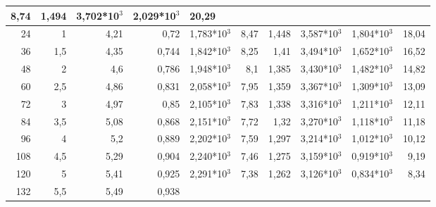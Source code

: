 \begin{table}[H]
{\begin{tabular}{|rr|rrl|rrl|l|r|}
  \multicolumn{1}{r|}{8,74} &
  \multicolumn{1}{r|}{1,494} &
  3,702*10$^3$ &
  2,029*10$^3$ &
  20,29 \\ \hline
\multicolumn{1}{|r|}{24} &
  1 &
  \multicolumn{1}{r|}{4,21} &
  \multicolumn{1}{r|}{0,72} &
  1,783*10$^3$ &
  \multicolumn{1}{r|}{8,47} &
  \multicolumn{1}{r|}{1,448} &
  3,587*10$^3$ &
  1,804*10$^3$ &
  18,04 \\ \hline
\multicolumn{1}{|r|}{36} &
  1,5 &
  \multicolumn{1}{r|}{4,35} &
  \multicolumn{1}{r|}{0,744} &
  1,842*10$^3$ &
  \multicolumn{1}{r|}{8,25} &
  \multicolumn{1}{r|}{1,41} &
  3,494*10$^3$ &
  1,652*10$^3$ &
  16,52 \\ \hline
\multicolumn{1}{|r|}{48} &
  2 &
  \multicolumn{1}{r|}{4,6} &
  \multicolumn{1}{r|}{0,786} &
  1,948*10$^3$ &
  \multicolumn{1}{r|}{8,1} &
  \multicolumn{1}{r|}{1,385} &
  3,430*10$^3$ &
  1,482*10$^3$ &
  14,82 \\ \hline
\multicolumn{1}{|r|}{60} &
  2,5 &
  \multicolumn{1}{r|}{4,86} &
  \multicolumn{1}{r|}{0,831} &
  2,058*10$^3$ &
  \multicolumn{1}{r|}{7,95} &
  \multicolumn{1}{r|}{1,359} &
  3,367*10$^3$ &
  1,309*10$^3$ &
  13,09 \\ \hline
\multicolumn{1}{|r|}{72} &
  3 &
  \multicolumn{1}{r|}{4,97} &
  \multicolumn{1}{r|}{0,85} &
  2,105*10$^3$ &
  \multicolumn{1}{r|}{7,83} &
  \multicolumn{1}{r|}{1,338} &
  3,316*10$^3$ &
  1,211*10$^3$ &
  12,11 \\ \hline
\multicolumn{1}{|r|}{84} &
  3,5 &
  \multicolumn{1}{r|}{5,08} &
  \multicolumn{1}{r|}{0,868} &
  2,151*10$^3$ &
  \multicolumn{1}{r|}{7,72} &
  \multicolumn{1}{r|}{1,32} &
  3,270*10$^3$ &
  1,118*10$^3$ &
  11,18 \\ \hline
\multicolumn{1}{|r|}{96} &
  4 &
  \multicolumn{1}{r|}{5,2} &
  \multicolumn{1}{r|}{0,889} &
  2,202*10$^3$ &
  \multicolumn{1}{r|}{7,59} &
  \multicolumn{1}{r|}{1,297} &
  3,214*10$^3$ &
  1,012*10$^3$ &
  10,12 \\ \hline
\multicolumn{1}{|r|}{108} &
  4,5 &
  \multicolumn{1}{r|}{5,29} &
  \multicolumn{1}{r|}{0,904} &
  2,240*10$^3$ &
  \multicolumn{1}{r|}{7,46} &
  \multicolumn{1}{r|}{1,275} &
  3,159*10$^3$ &
  0,919*10$^3$ &
  9,19 \\ \hline
\multicolumn{1}{|r|}{120} &
  5 &
  \multicolumn{1}{r|}{5,41} &
  \multicolumn{1}{r|}{0,925} &
  2,291*10$^3$ &
  \multicolumn{1}{r|}{7,38} &
  \multicolumn{1}{r|}{1,262} &
  3,126*10$^3$ &
  0,834*10$^3$ &
  8,34 \\ \hline
\multicolumn{1}{|r|}{132} &
  5,5 &
  \multicolumn{1}{r|}{5,49} &
  \multicolumn{1}{r|}{0,938} &

\end{tabular}}
\end{table}
